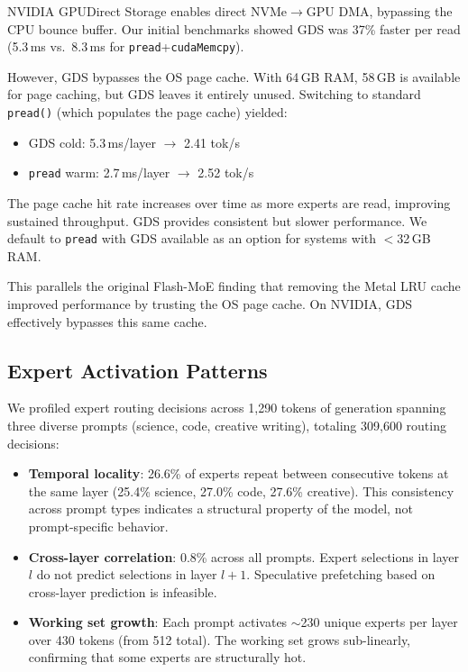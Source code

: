 \documentclass[10pt]{article}
\begin{document}
NVIDIA GPUDirect Storage enables direct NVMe$\to$GPU DMA, bypassing the CPU bounce buffer. Our initial benchmarks showed GDS was 37\% faster per read (5.3\,ms vs.\ 8.3\,ms for \texttt{pread}+\texttt{cudaMemcpy}).

However, GDS bypasses the OS page cache. With 64\,GB RAM, 58\,GB is available for page caching, but GDS leaves it entirely unused. Switching to standard \texttt{pread()} (which populates the page cache) yielded:

\begin{itemize}[nosep]
    \item GDS cold: 5.3\,ms/layer $\to$ 2.41 tok/s
    \item \texttt{pread} warm: 2.7\,ms/layer $\to$ 2.52 tok/s
\end{itemize}

The page cache hit rate increases over time as more experts are read, improving sustained throughput. GDS provides consistent but slower performance. We default to \texttt{pread} with GDS available as an option for systems with $<$32\,GB RAM.

This parallels the original Flash-MoE finding that removing the Metal LRU cache improved performance by trusting the OS page cache. On NVIDIA, GDS effectively bypasses this same cache.

\subsection{Expert Activation Patterns}

We profiled expert routing decisions across 1,290 tokens of generation spanning three diverse prompts (science, code, creative writing), totaling 309,600 routing decisions:

\begin{itemize}[nosep]
    \item \textbf{Temporal locality}: 26.6\% of experts repeat between consecutive tokens at the same layer (25.4\% science, 27.0\% code, 27.6\% creative). This consistency across prompt types indicates a structural property of the model, not prompt-specific behavior.
    \item \textbf{Cross-layer correlation}: 0.8\% across all prompts. Expert selections in layer $l$ do not predict selections in layer $l+1$. Speculative prefetching based on cross-layer prediction is infeasible.
    \item \textbf{Working set growth}: Each prompt activates $\sim$230 unique experts per layer over 430 tokens (from 512 total). The working set grows sub-linearly, confirming that some experts are structurally hot.
\end{itemize}
\end{document}
